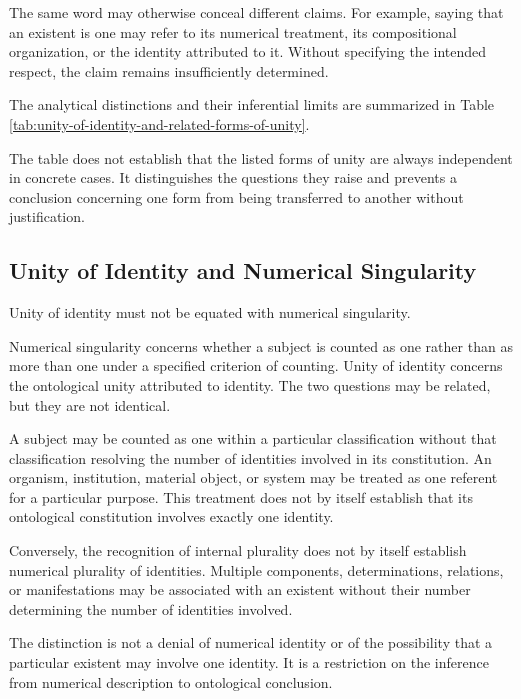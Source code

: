The same word may otherwise conceal different claims.
For example, saying that an existent is one may
refer to its numerical treatment, its compositional
organization, or the identity attributed to it.
Without specifying the intended respect, the claim
remains insufficiently determined.

The analytical distinctions and their inferential
limits are summarized in Table
\ref{tab:unity-of-identity-and-related-forms-of-unity}.



The table does not establish that the listed forms
of unity are always independent in concrete cases.
It distinguishes the questions they raise and prevents
a conclusion concerning one form from being transferred
to another without justification.

\subsection{Unity of Identity and Numerical Singularity}

Unity of identity must not be equated with numerical
singularity.

Numerical singularity concerns whether a subject
is counted as one rather than as more than one
under a specified criterion of counting. Unity
of identity concerns the ontological unity attributed
to identity. The two questions may be related,
but they are not identical.

A subject may be counted as one within a particular
classification without that classification resolving
the number of identities involved in its constitution.
An organism, institution, material object, or system
may be treated as one referent for a particular
purpose. This treatment does not by itself establish
that its ontological constitution involves exactly
one identity.

Conversely, the recognition of internal plurality
does not by itself establish numerical plurality
of identities. Multiple components, determinations,
relations, or manifestations may be associated
with an existent without their number determining
the number of identities involved.

The distinction is not a denial of numerical identity
or of the possibility that a particular existent
may involve one identity. It is a restriction
on the inference from numerical description to
ontological conclusion.


